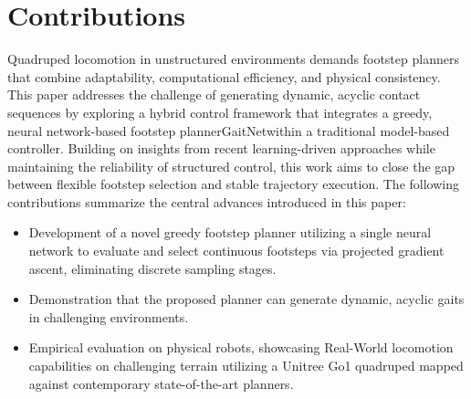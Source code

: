 \section{Contributions}
\label{sec:introduction-contributions}

Quadruped locomotion in unstructured environments demands footstep
planners that combine adaptability, computational efficiency, and
physical consistency. This paper addresses the challenge of
generating dynamic, acyclic contact sequences by exploring a hybrid
control framework that integrates a greedy, neural network-based
footstep planner\textemdash GaitNet\textemdash within a traditional
model-based controller. Building on insights from recent
learning-driven approaches while maintaining the reliability of
structured control, this work aims to close the gap between flexible
footstep selection and stable trajectory execution. The following
contributions summarize the central advances introduced in this paper:

\begin{itemize}
  \item Development of a novel greedy footstep planner utilizing a single
    neural network to evaluate and select continuous footsteps via
    projected gradient ascent, eliminating discrete sampling stages.
  \item Demonstration that the proposed planner can generate dynamic,
    acyclic gaits in challenging environments.
  \item Empirical evaluation on physical robots, showcasing Real-World
    locomotion capabilities on challenging terrain utilizing a Unitree Go1
    quadruped mapped against contemporary state-of-the-art planners.
\end{itemize}
